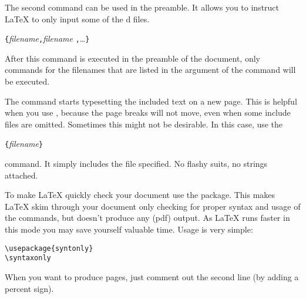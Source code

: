 The second command can be used in the preamble. It allows you to
instruct \LaTeX{} to only input some of the \verb||d files.
\begin{lscommand}
\verb|{|\emph{filename}\verb|,|\emph{filename}%
\verb|,|\ldots\verb|}|
\end{lscommand}
After this command is executed in the preamble of the document, only
 commands for the filenames that are listed in the
argument of the  command will be executed.

The  command starts typesetting the included text on a new
page. This is helpful when you use , because the
page breaks will not move, even when some include files are omitted.
Sometimes this might not be desirable. In this case, use the
\begin{lscommand}
\verb|{|\emph{filename}\verb|}|
\end{lscommand}
\noindent command. It simply includes the file specified.
No flashy suits, no strings attached.


To make \LaTeX{} quickly check your document use the 
package. This makes \LaTeX{} skim through your document only checking for
proper syntax and usage of the commands, but doesn't produce any (pdf) output.
As \LaTeX{} runs faster in this mode you may save yourself valuable time.
Usage is very simple:

\begin{verbatim}
\usepackage{syntonly}
\syntaxonly
\end{verbatim}
When you want to produce pages, just comment out the second line
(by adding a percent sign).


%

